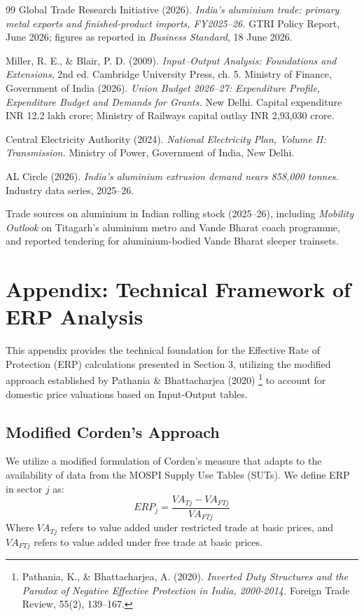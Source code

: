 \documentclass[11pt, a4paper]{article}
\numberwithin{figure}{section}
\numberwithin{table}{section}
\begin{document}
\begin{thebibliography}{99}
Global Trade Research Initiative (2026).
\textit{India's aluminium trade: primary metal exports and finished-product imports,
FY2025--26.} GTRI Policy Report, June 2026; figures as reported in
\textit{Business Standard}, 18 June 2026.

Miller, R. E., \& Blair, P. D. (2009).
\textit{Input--Output Analysis: Foundations and Extensions}, 2nd ed.
Cambridge University Press, ch. 5.
Ministry of Finance, Government of India (2026).
\textit{Union Budget 2026--27: Expenditure Profile, Expenditure Budget and Demands for
Grants.} New Delhi. Capital expenditure INR 12.2 lakh crore; Ministry of Railways
capital outlay INR 2,93,030 crore.

Central Electricity Authority (2024).
\textit{National Electricity Plan, Volume II: Transmission.}
Ministry of Power, Government of India, New Delhi.

AL Circle (2026).
\textit{India's aluminium extrusion demand nears 858,000 tonnes.}
Industry data series, 2025--26.

Trade sources on aluminium in Indian rolling stock (2025--26), including
\textit{Mobility Outlook} on Titagarh's aluminium metro and Vande Bharat coach
programme, and reported tendering for aluminium-bodied Vande Bharat sleeper trainsets.

\end{thebibliography}

\newpage
\appendix
\section{Appendix: Technical Framework of ERP Analysis}
\label{app:erp}
This appendix provides the technical foundation for the Effective Rate of Protection (ERP) calculations presented in Section 3, utilizing the modified approach established by Pathania \& Bhattacharjea (2020) \cite{pathania2020}\footnote{Pathania, K., \& Bhattacharjea, A. (2020). \textit{Inverted Duty Structures and the Paradox of Negative Effective Protection in India, 2000-2014.} Foreign Trade Review, 55(2), 139--167.} to account for domestic price valuations based on Input-Output tables.

\subsection{Modified Corden's Approach}
We utilize a modified formulation of Corden's measure that adapts to the availability of data from the MOSPI Supply Use Tables (SUTs). We define ERP in sector $j$ as:
$$ ERP_j = \frac{VA_{Tj} - VA_{FTj}}{VA_{FTj}} $$
Where $VA_{Tj}$ refers to value added under restricted trade at basic prices, and $VA_{FTj}$ refers to value added under free trade at basic prices.
\end{document}
